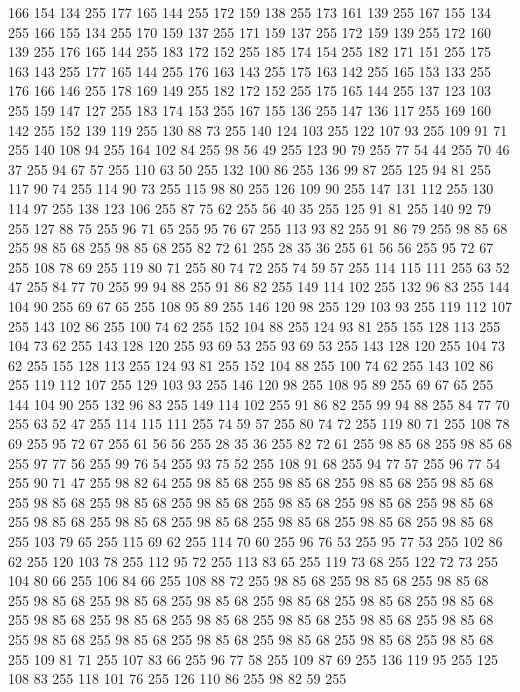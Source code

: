 166 154 134 255 177 165 144 255 172 159 138 255 173 161 139 255 167 155 134 255 166 155 134 255 170 159 137 255 171 159 137 255 172 159 139 255 172 160 139 255 176 165 144 255 183 172 152 255 185 174 154 255 182 171 151 255 175 163 143 255 177 165 144 255 176 163 143 255 175 163 142 255 165 153 133 255 176 166 146 255 178 169 149 255 182 172 152 255 175 165 144 255 137 123 103 255 159 147 127 255 183 174 153 255 167 155 136 255 147 136 117 255 169 160 142 255 152 139 119 255 130 88 73 255 140 124 103 255 122 107 93 255 109 91 71 255 140 108 94 255 164 102 84 255 98 56 49 255 123 90 79 255 77 54 44 255 70 46 37 255 94 67 57 255 110 63 50 255 132 100 86 255 136 99 87 255 125 94 81 255 117 90 74 255 114 90 73 255 115 98 80 255 126 109 90 255 147 131 112 255 130 114 97 255 138 123 106 255 87 75 62 255 56 40 35 255 125 91 81 255 140 92 79 255 127 88 75 255 96 71 65 255 95 76 67 255 113 93 82 255 91 86 79 255 98 85 68 255 98 85 68 255 98 85 68 255
82 72 61 255 28 35 36 255 61 56 56 255 95 72 67 255 108 78 69 255 119 80 71 255 80 74 72 255 74 59 57 255 114 115 111 255 63 52 47 255 84 77 70 255 99 94 88 255 91 86 82 255 149 114 102 255 132 96 83 255 144 104 90 255 69 67 65 255 108 95 89 255 146 120 98 255 129 103 93 255 119 112 107 255 143 102 86 255 100 74 62 255 152 104 88 255 124 93 81 255 155 128 113 255 104 73 62 255 143 128 120 255 93 69 53 255 93 69 53 255 143 128 120 255 104 73 62 255 155 128 113 255 124 93 81 255 152 104 88 255 100 74 62 255 143 102 86 255 119 112 107 255 129 103 93 255 146 120 98 255 108 95 89 255 69 67 65 255 144 104 90 255 132 96 83 255 149 114 102 255 91 86 82 255 99 94 88 255 84 77 70 255 63 52 47 255 114 115 111 255 74 59 57 255 80 74 72 255 119 80 71 255 108 78 69 255 95 72 67 255 61 56 56 255 28 35 36 255 82 72 61 255 98 85 68 255 98 85 68 255 97 77 56 255 99 76 54 255 93 75 52 255 108 91 68 255
94 77 57 255 96 77 54 255 90 71 47 255 98 82 64 255 98 85 68 255 98 85 68 255 98 85 68 255 98 85 68 255 98 85 68 255 98 85 68 255 98 85 68 255 98 85 68 255 98 85 68 255 98 85 68 255 98 85 68 255 98 85 68 255 98 85 68 255 98 85 68 255 98 85 68 255 98 85 68 255 103 79 65 255 115 69 62 255 114 70 60 255 96 76 53 255 95 77 53 255 102 86 62 255 120 103 78 255 112 95 72 255 113 83 65 255 119 73 68 255 122 72 73 255 104 80 66 255 106 84 66 255 108 88 72 255 98 85 68 255 98 85 68 255 98 85 68 255 98 85 68 255 98 85 68 255 98 85 68 255 98 85 68 255 98 85 68 255 98 85 68 255 98 85 68 255 98 85 68 255 98 85 68 255 98 85 68 255 98 85 68 255 98 85 68 255 98 85 68 255 98 85 68 255 98 85 68 255 98 85 68 255 98 85 68 255 98 85 68 255 109 81 71 255 107 83 66 255 96 77 58 255 109 87 69 255 136 119 95 255 125 108 83 255 118 101 76 255 126 110 86 255 98 82 59 255
